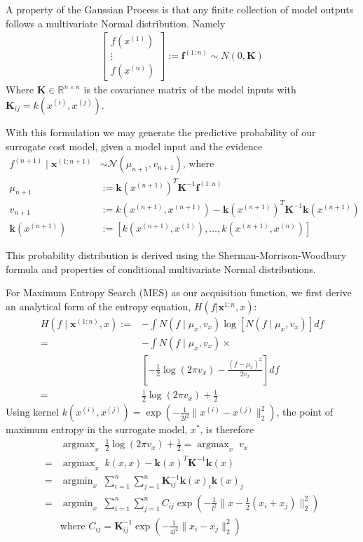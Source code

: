 \documentclass[10pt,twocolumn,letterpaper]{article}
\begin{document}
A property of the Gaussian Process is that any finite collection of model outputs follows a multivariate Normal distribution. Namely
\begin{align*}
    \begin{bmatrix}
        f(x^{(1)})\\\vdots\\f(x^{(n)})
    \end{bmatrix} := \textbf{f}^{(1:n)} \sim N(0, \textbf{K})
\end{align*}
Where $\textbf{K}\in \mathbb{R}^{n\times n}$ is the covariance matrix of the model inputs with $\textbf{K}_{ij} = k(x^{(i)}, x^{(j)})$.

With this formulation we may generate the predictive probability of our surrogate cost model, given a model input and the evidence
\begin{align*}
    f^{(n+1)} \mid \textbf{x}^{(1:n+1)} &\sim \mathcal{N}(\mu_{n+1}, v_{n+1}) \textrm{, where}\\
    \mu_{n+1} &:= \textbf{k}(x^{(n+1)})^T\textbf{K}^{-1}\textbf{f}^{(1:n)}\\
    v_{n+1} &:= k(x^{(n+1)}, x^{(n+1)}) - \textbf{k}(x^{(n+1)})^T\textbf{K}^{-1}\textbf{k}(x^{(n+1)})\\
    \textbf{k}(x^{(n+1)}) &:= \left[k(x^{(n+1)}, x^{(1)}), \dots, k(x^{(n+1)}, x^{(n)})\right]
\end{align*}

This probability distribution is derived using the Sherman-Morrison-Woodbury formula and properties of conditional multivariate Normal distributions. 

For Maximum Entropy Search (MES) as our acquisition function, we first derive an analytical form of the entropy equation, $H(f | \textbf{x}^{1:n}, x)$:
\begin{align*}
    H(f \mid \textbf{x}^{(1:n)}, x) :=& -\int N(f \mid \mu_x, v_x) \log\left[N(f \mid \mu_x, v_x)\right]df\\
    =& -\int N(f \mid \mu_x, v_x) \times \\
    & \left[-\frac{1}{2}\log(2\pi v_x) - \frac{(f - \mu_x)^2}{2v_x}\right]df\\
    =& \frac{1}{2}\log(2\pi v_x) + \frac{1}{2}
\end{align*}
Using kernel $k(x^{(i)}, x^{(j)}) = \exp\left(-\frac{1}{2l^2}\lVert x^{(i)} - x^{(j)}\rVert^2_2\right)$, the point of maximum entropy in the surrogate model, $x^*$, is therefore
\begin{align*}
    &\; \textrm{argmax}_x \;\; \frac{1}{2}\log(2\pi v_x) + \frac{1}{2} = \; \textrm{argmax}_x \;\; v_x \\
    =&\; \textrm{argmax}_x \;\; k(x, x) - \textbf{k}(x)^T\textbf{K}^{-1}\textbf{k}(x)\\
    =&\; \textrm{argmin}_x \;\; \sum_{i=1}^n\sum_{j=1}^n \textbf{K}^{-1}_{ij} \textbf{k}(x)_i \textbf{k}(x)_j\\
    =&\; \textrm{argmin}_x \;\; \sum_{i=1}^n\sum_{j=1}^n C_{ij} \exp\left(-\frac{1}{l^2}\lVert x - \frac{1}{2}(x_i + x_j)\rVert _2^2\right)\\
    &\textrm{where } C_{ij} = \textbf{K}^{-1}_{ij}\exp(-\frac{1}{4l^2}\lVert x_i - x_j\rVert^2_2)
\end{align*}
\end{document}
